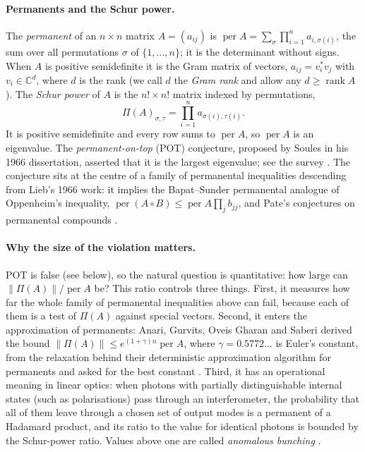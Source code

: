 \documentclass[11pt,a4paper]{article}
\theoremstyle{remark}
\newcommand{\per}{\operatorname{per}}
\newcommand{\norm}[1]{\left\lVert#1\right\rVert}
\newcommand{\C}{\mathbb C}
\begin{document}
\paragraph{Permanents and the Schur power.}
The \emph{permanent} of an $n\times n$ matrix $A=(a_{ij})$ is $\per A=\sum_{\sigma}\prod_{i=1}^n a_{i,\sigma(i)}$, the sum over all permutations $\sigma$ of $\{1,\dots,n\}$; it is the determinant without signs. When $A$ is positive semidefinite it is the Gram matrix of vectors, $a_{ij}=v_i^*v_j$ with $v_i\in\C^d$, where $d$ is the rank (we call $d$ the \emph{Gram rank} and allow any $d\ge\operatorname{rank}A$). The \emph{Schur power} of $A$ is the $n!\times n!$ matrix indexed by permutations,
\[
 \Pi(A)_{\sigma,\tau}=\prod_{i=1}^n a_{\sigma(i),\tau(i)} .
\]
It is positive semidefinite and every row sums to $\per A$, so $\per A$ is an eigenvalue. The \emph{permanent-on-top} (POT) conjecture, proposed by Soules in his 1966 dissertation, asserted that it is the largest eigenvalue; see the survey \cite{Zhang16}. The conjecture sits at the centre of a family of permanental inequalities descending from Lieb's 1966 work: it implies the Bapat--Sunder permanental analogue of Oppenheim's inequality, $\per(A\circ B)\le\per A\prod_jb_{jj}$, and Pate's conjectures on permanental compounds \cite{Drury16,Drury17,Pate,Anh}.

\paragraph{Why the size of the violation matters.}
POT is false (see below), so the natural question is quantitative: how large can $\norm{\Pi(A)}/\per A$ be? This ratio controls three things. First, it measures how far the whole family of permanental inequalities above can fail, because each of them is a test of $\Pi(A)$ against special vectors. Second, it enters the approximation of permanents: Anari, Gurvits, Oveis Gharan and Saberi derived the bound $\norm{\Pi(A)}\le e^{(1+\gamma)n}\per A$, where $\gamma=0.5772\ldots$ is Euler's constant, from the relaxation behind their deterministic approximation algorithm for permanents and asked for the best constant \cite[Theorem~2 and Problem~1]{AGGS}. Third, it has an operational meaning in linear optics: when photons with partially distinguishable internal states (such as polarisations) pass through an interferometer, the probability that all of them leave through a chosen set of output modes is a permanent of a Hadamard product, and its ratio to the value for identical photons is bounded by the Schur-power ratio. Values above one are called \emph{anomalous bunching} \cite{SNC,PNC26}.
\end{document}
